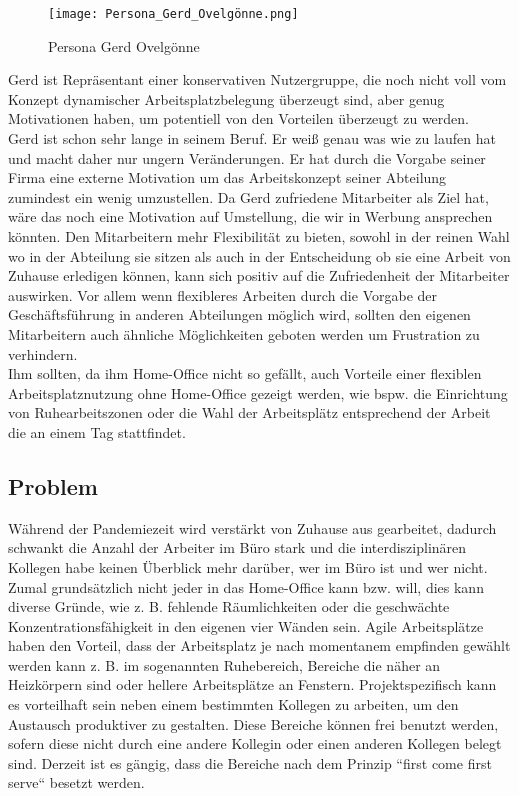 \pagebreak

\begin{figure}[!h]
    \centering
    \texttt{[image: Persona\_Gerd\_Ovelgönne.png]}
    \caption{Persona Gerd Ovelgönne}
    \label{fig:PersonaGerdOvelgönne}
\end{figure}

Gerd ist Repräsentant einer konservativen Nutzergruppe, die noch nicht voll vom Konzept dynamischer Arbeitsplatzbelegung überzeugt sind, aber genug Motivationen haben, um potentiell von den Vorteilen überzeugt zu werden.
\\
Gerd ist schon sehr lange in seinem Beruf.
Er weiß genau was wie zu laufen hat und macht daher nur ungern Veränderungen.
Er hat durch die Vorgabe seiner Firma eine externe Motivation um das Arbeitskonzept seiner Abteilung zumindest ein wenig umzustellen.
Da Gerd zufriedene Mitarbeiter als Ziel hat, wäre das noch eine Motivation auf Umstellung, die wir in Werbung ansprechen könnten.
Den Mitarbeitern mehr Flexibilität zu bieten, sowohl in der reinen Wahl wo in der Abteilung sie sitzen als auch in der Entscheidung ob sie eine Arbeit von Zuhause erledigen können, kann sich positiv auf die Zufriedenheit der Mitarbeiter auswirken.
Vor allem wenn flexibleres Arbeiten durch die Vorgabe der Geschäftsführung in anderen Abteilungen möglich wird, sollten den eigenen Mitarbeitern auch ähnliche Möglichkeiten geboten werden um Frustration zu verhindern.
\\
Ihm sollten, da ihm Home-Office nicht so gefällt, auch Vorteile einer flexiblen Arbeitsplatznutzung ohne Home-Office gezeigt werden, wie bspw. die Einrichtung von Ruhearbeitszonen oder die Wahl der Arbeitsplätz entsprechend der Arbeit die an einem Tag stattfindet.


\subsection{Problem}
Während der Pandemiezeit wird verstärkt von Zuhause aus gearbeitet, dadurch schwankt die Anzahl der Arbeiter im Büro stark und die interdisziplinären Kollegen habe keinen Überblick mehr darüber, wer im Büro ist und wer nicht.
Zumal grundsätzlich nicht jeder in das Home-Office kann bzw. will, dies kann diverse Gründe, wie z. B. fehlende Räumlichkeiten oder die geschwächte Konzentrationsfähigkeit in den eigenen vier Wänden sein.
Agile Arbeitsplätze haben den Vorteil, dass der Arbeitsplatz je nach momentanem empfinden gewählt werden kann z. B. im sogenannten Ruhebereich, Bereiche die näher an Heizkörpern sind oder hellere Arbeitsplätze an Fenstern.
Projektspezifisch kann es vorteilhaft sein neben einem bestimmten Kollegen zu arbeiten, um den Austausch produktiver zu gestalten.
Diese Bereiche können frei benutzt werden, sofern diese nicht durch eine andere Kollegin oder einen anderen Kollegen belegt sind.
Derzeit ist es gängig, dass die Bereiche nach dem Prinzip “first come first serve“ besetzt werden. 

